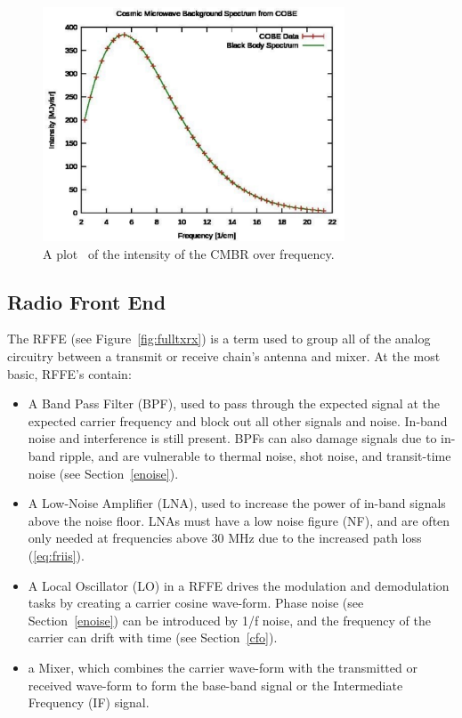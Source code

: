 \FloatBarrier
\begin{figure}[ht!]
	\centering	\includegraphics[width=0.8\textwidth,keepaspectratio]{figs/cmbr.png}
    \caption{A plot~\cite{cmbr} of the intensity of the CMBR over frequency.} 
\label{fig:cmbr}      
\end{figure}
\FloatBarrier

\subsection{Radio Front End}
The RFFE (see Figure~\ref{fig:fulltxrx}) is a term used to group all of the analog circuitry between a transmit or receive chain's antenna and mixer. At the most basic, RFFE's contain:
\begin{itemize}
\item A Band Pass Filter (BPF), used to pass through the expected signal at the expected carrier frequency and block out all other signals and noise. In-band noise and interference is still present. BPFs can also damage signals due to in-band ripple, and are vulnerable to thermal noise, shot noise, and transit-time noise (see Section~\ref{enoise}).
\item A Low-Noise Amplifier (LNA), used to increase the power of in-band signals above the noise floor. LNAs must have a low noise figure (NF), and are often only needed at frequencies above 30 MHz due to the increased path loss (\ref{eq:friis}).
\item A Local Oscillator (LO) in a RFFE drives the modulation and demodulation tasks by creating a carrier cosine wave-form. Phase noise (see Section~\ref{enoise}) can be introduced by 1/f noise, and the frequency of the carrier can drift with time (see Section~\ref{cfo}).
\item a Mixer, which combines the carrier wave-form with the transmitted or received wave-form to form the base-band signal or the Intermediate Frequency (IF) signal.
\end{itemize}

